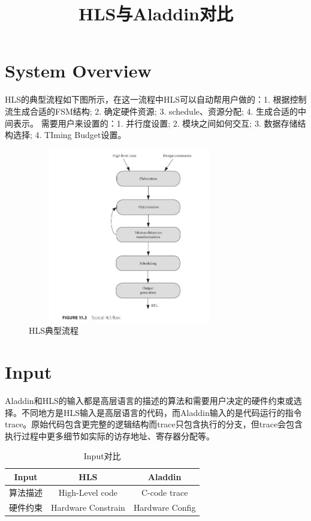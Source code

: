 \documentclass[UTF8]{scrartcl}
\title{HLS与Aladdin对比}
\author{}
\begin{document}
\maketitle

\begin{abstract}

\end{abstract}

\section{System Overview}
	
	HLS的典型流程如下图所示，在这一流程中HLS可以自动帮用户做的：1. 根据控制流生成合适的FSM结构; 2. 确定硬件资源; 3. schedule、资源分配; 4. 生成合适的中间表示。 需要用户来设置的：1. 并行度设置; 2. 模块之间如何交互; 3. 数据存储结构选择; 4. TIming Budget设置。 

	\begin{figure}[h]
 		\centering
		 \includegraphics[width=3.50in,height=3.00in]{hls_flow.jpg} 
		\caption{HLS典型流程}
		\label{fig1}
	\end{figure}

\section{Input}

	Aladdin和HLS的输入都是高层语言的描述的算法和需要用户决定的硬件约束或选择。不同地方是HLS输入是高层语言的代码，而Aladdin输入的是代码运行的指令trace。原始代码包含更完整的逻辑结构而trace只包含执行的分支，但trace会包含执行过程中更多细节如实际的访存地址、寄存器分配等。

	\begin{table}[h]
		\centering
		\caption{Input对比}
		\begin{tabular*}{10cm}{c |c|c }
			\hline
			Input  &  HLS  & Aladdin   \\
			\hline
		     算法描述&High-Level code & C-code trace \\
			\hline
			 硬件约束&Hardware Constrain  &Hardware Config \\
			\hline
		\end{tabular*}	
	\end{table}
	
\end{document}
